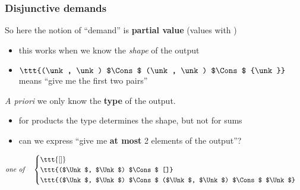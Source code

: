 \begin{frame}[fragile]
\frametitle{Disjunctive demands}

So here the notion of ``demand'' is \textbf{partial value} (values with \unk)
\begin{itemize}
\item this works when we know the \emph{shape} of the output
\item \pause $\ttt{(\unk, \unk) $\Cons$ (\unk, \unk) $\Cons$ {\unk}}$
  means ``give me the first two pairs''
\end{itemize}

\vspace{10pt}
\pause \emph{A priori} we only know the \textbf{type} of the output.

\pause
\begin{itemize}
\item for products the type determines the shape, but not for sums
\item \pause can we express ``give me \textbf{at most} 2 elements of the output''?
\end{itemize}
\pause
\[
\text{\emph{one of}\quad}
\begin{cases}
\ttt{[]} \\
\ttt{($\Unk$, $\Unk$) $\Cons$ []} \\
\ttt{($\Unk$, $\Unk$) $\Cons$ ($\Unk$, $\Unk$) $\Cons$ $\Unk$}
\end{cases}
\]
\end{frame}
